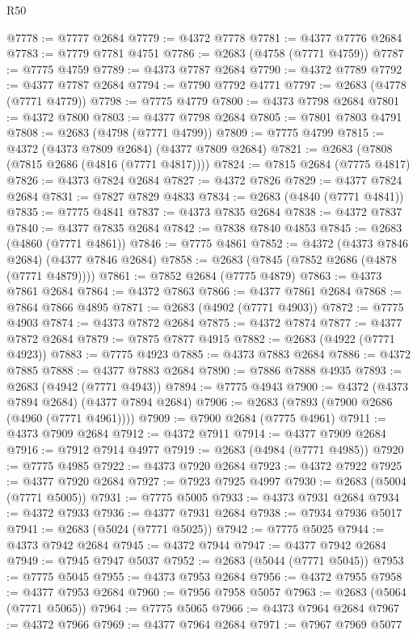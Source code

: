 \begin{lexlean}{R50}
\begin{coremodule}
@7778 := @7777 @2684
@7779 := @4372 @7778
@7781 := @4377 @7776 @2684
@7783 := @7779 @7781 @4751
@7786 := @2683 (@4758 (@7771 @4759))
@7787 := @7775 @4759
@7789 := @4373 @7787 @2684
@7790 := @4372 @7789
@7792 := @4377 @7787 @2684
@7794 := @7790 @7792 @4771
@7797 := @2683 (@4778 (@7771 @4779))
@7798 := @7775 @4779
@7800 := @4373 @7798 @2684
@7801 := @4372 @7800
@7803 := @4377 @7798 @2684
@7805 := @7801 @7803 @4791
@7808 := @2683 (@4798 (@7771 @4799))
@7809 := @7775 @4799
@7815 := @4372 (@4373 @7809 @2684) (@4377 @7809 @2684)
@7821 := @2683 (@7808 (@7815 @2686 (@4816 (@7771 @4817))))
@7824 := @7815 @2684 (@7775 @4817)
@7826 := @4373 @7824 @2684
@7827 := @4372 @7826
@7829 := @4377 @7824 @2684
@7831 := @7827 @7829 @4833
@7834 := @2683 (@4840 (@7771 @4841))
@7835 := @7775 @4841
@7837 := @4373 @7835 @2684
@7838 := @4372 @7837
@7840 := @4377 @7835 @2684
@7842 := @7838 @7840 @4853
@7845 := @2683 (@4860 (@7771 @4861))
@7846 := @7775 @4861
@7852 := @4372 (@4373 @7846 @2684) (@4377 @7846 @2684)
@7858 := @2683 (@7845 (@7852 @2686 (@4878 (@7771 @4879))))
@7861 := @7852 @2684 (@7775 @4879)
@7863 := @4373 @7861 @2684
@7864 := @4372 @7863
@7866 := @4377 @7861 @2684
@7868 := @7864 @7866 @4895
@7871 := @2683 (@4902 (@7771 @4903))
@7872 := @7775 @4903
@7874 := @4373 @7872 @2684
@7875 := @4372 @7874
@7877 := @4377 @7872 @2684
@7879 := @7875 @7877 @4915
@7882 := @2683 (@4922 (@7771 @4923))
@7883 := @7775 @4923
@7885 := @4373 @7883 @2684
@7886 := @4372 @7885
@7888 := @4377 @7883 @2684
@7890 := @7886 @7888 @4935
@7893 := @2683 (@4942 (@7771 @4943))
@7894 := @7775 @4943
@7900 := @4372 (@4373 @7894 @2684) (@4377 @7894 @2684)
@7906 := @2683 (@7893 (@7900 @2686 (@4960 (@7771 @4961))))
@7909 := @7900 @2684 (@7775 @4961)
@7911 := @4373 @7909 @2684
@7912 := @4372 @7911
@7914 := @4377 @7909 @2684
@7916 := @7912 @7914 @4977
@7919 := @2683 (@4984 (@7771 @4985))
@7920 := @7775 @4985
@7922 := @4373 @7920 @2684
@7923 := @4372 @7922
@7925 := @4377 @7920 @2684
@7927 := @7923 @7925 @4997
@7930 := @2683 (@5004 (@7771 @5005))
@7931 := @7775 @5005
@7933 := @4373 @7931 @2684
@7934 := @4372 @7933
@7936 := @4377 @7931 @2684
@7938 := @7934 @7936 @5017
@7941 := @2683 (@5024 (@7771 @5025))
@7942 := @7775 @5025
@7944 := @4373 @7942 @2684
@7945 := @4372 @7944
@7947 := @4377 @7942 @2684
@7949 := @7945 @7947 @5037
@7952 := @2683 (@5044 (@7771 @5045))
@7953 := @7775 @5045
@7955 := @4373 @7953 @2684
@7956 := @4372 @7955
@7958 := @4377 @7953 @2684
@7960 := @7956 @7958 @5057
@7963 := @2683 (@5064 (@7771 @5065))
@7964 := @7775 @5065
@7966 := @4373 @7964 @2684
@7967 := @4372 @7966
@7969 := @4377 @7964 @2684
@7971 := @7967 @7969 @5077

\end{coremodule}
\end{lexlean}
